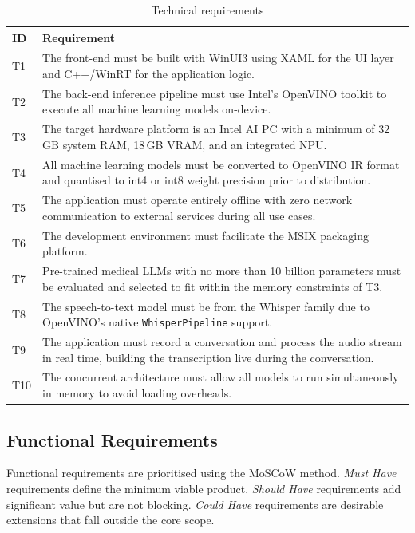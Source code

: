 \begin{table}[H]
\centering
\begin{tabularx}{\textwidth}{l X}
\toprule
\textbf{ID} & \textbf{Requirement} \\
\midrule
T1 & The front-end must be built with WinUI3 using XAML for the UI layer and C++/WinRT for the application logic. \\
T2 & The back-end inference pipeline must use Intel's OpenVINO toolkit to execute all machine learning models on-device. \\
T3 & The target hardware platform is an Intel AI PC with a minimum of 32\,GB system RAM, 18\,GB VRAM, and an integrated NPU. \\
T4 & All machine learning models must be converted to OpenVINO IR format and quantised to int4 or int8 weight precision prior to distribution. \\
T5 & The application must operate entirely offline with zero network communication to external services during all use cases. \\
T6 & The development environment must facilitate the MSIX packaging platform. \\
T7 & Pre-trained medical LLMs with no more than 10 billion parameters must be evaluated and selected to fit within the memory constraints of T3. \\
T8 & The speech-to-text model must be from the Whisper family due to OpenVINO's native \texttt{WhisperPipeline} support. \\
T9 & The application must record a conversation and process the audio stream in real time, building the transcription live during the conversation. \\
T10 & The concurrent architecture must allow all models to run simultaneously in memory to avoid loading overheads. \\
\bottomrule
\end{tabularx}
\caption{Technical requirements}
\label{tab:treq}
\end{table}

\subsection{Functional Requirements}
\label{app:freq}

Functional requirements are prioritised using the MoSCoW method. \textit{Must Have} requirements define the minimum viable product. \textit{Should Have} requirements add significant value but are not blocking. \textit{Could Have} requirements are desirable extensions that fall outside the core scope.

